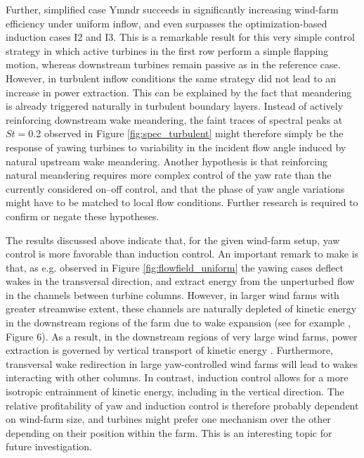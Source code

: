 Further, simplified case Ymndr succeeds in significantly increasing wind-farm efficiency under uniform inflow, and even surpasses the optimization-based induction cases I2 and I3. This is a remarkable result for this very simple control strategy in which active turbines in the first row perform a simple flapping motion, whereas downstream turbines remain passive as in the reference case. However, in turbulent inflow conditions the same strategy did not lead to an increase in power extraction. This can be explained by the fact that meandering is already triggered naturally in turbulent boundary layers. Instead of actively reinforcing downstream wake meandering, the faint traces of spectral peaks at $St = 0.2$ observed in Figure \ref{fig:spec_turbulent} might therefore simply be the response of yawing turbines to variability in the incident flow angle induced by natural upstream wake meandering. Another hypothesis is that reinforcing natural meandering requires more complex control of the yaw rate than the currently considered on--off control, and that the phase of yaw angle variations might have to be matched to local flow conditions. Further research is required to confirm or negate these hypotheses.

The results discussed above indicate that, for the given wind-farm setup, yaw control is more favorable than induction control.
An important remark to make is that, as e.g. observed in Figure \ref{fig:flowfield_uniform} the yawing cases deflect wakes in the transversal direction, and extract energy from the unperturbed flow in the channels between turbine columns. However, in larger wind farms with greater streamwise extent, these channels are naturally depleted of kinetic energy in the downstream regions of the farm due to wake expansion (see for example \cite{allaerts2017boundary}, Figure 6). As a result, in the downstream regions of very large wind farms, power extraction is governed by vertical transport of kinetic energy \citep{cal2010experimental, calaf2010large}. Furthermore, transversal wake redirection in large yaw-controlled wind farms will lead to wakes interacting with other columns. In contrast, induction control allows for a more isotropic entrainment of kinetic energy, including in the vertical direction. The relative profitability of yaw and induction control is therefore probably dependent on wind-farm size, and turbines might prefer one mechanism over the other depending on their position within the farm. This is an interesting topic for future investigation.

